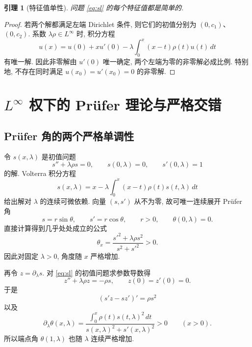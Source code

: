 \documentclass[UTF8]{ctexart}
\newtheorem{lemma}[theorem]{引理}
\begin{document}
\begin{lemma}[特征值单性]\label{lem:simple}
问题 \eqref{eq:sl} 的每个特征值都是简单的.
\end{lemma}

\begin{proof}
若两个解都满足左端 Dirichlet 条件, 则它们的初值分别为 $(0,c_1)$、$(0,c_2)$. 系数
$\lambda\rho\in L^\infty$ 时, 积分方程
\begin{equation*}
	u(x)=u(0)+xu'(0)-\lambda\int_0^x(x-t)\rho(t)u(t)\,dt
\end{equation*}
有唯一解. 因此非零解由 $u'(0)$ 唯一确定, 两个左端为零的非零解必成比例. 特别地,
不存在同时满足 $u(x_0)=u'(x_0)=0$ 的非零解.
\end{proof}

\section{\texorpdfstring{$L^\infty$}{L-infinity} 权下的 Pr\"ufer 理论与严格交错}
\subsection{Pr\"ufer 角的两个严格单调性}

令 $s(x,\lambda)$ 是初值问题
\begin{equation}
	s''+\lambda\rho s=0,\qquad s(0,\lambda)=0,\qquad s'(0,\lambda)=1
\end{equation}
的解. Volterra 积分方程
\begin{equation*}
	s(x,\lambda)=x-\lambda\int_0^x(x-t)\rho(t)s(t,\lambda)\,dt
\end{equation*}
给出解对 $\lambda$ 的连续可微依赖. 向量 $(s,s')$ 从不为零, 故可唯一连续展开 Pr\"ufer 角
\begin{equation*}
	s=r\sin\theta,\qquad s'=r\cos\theta,\qquad r>0,\qquad \theta(0,\lambda)=0.
\end{equation*}
直接计算得到几乎处处成立的公式
\begin{equation}
	\theta_x=\frac{s'^2+\lambda\rho s^2}{s^2+s'^2}>0.
	\label{eq:theta_x}
\end{equation}
因此对固定 $\lambda>0$, 角度随 $x$ 严格增加.

再令 $z=\partial_\lambda s$. 对 \eqref{eq:sl} 的初值问题求参数导数得
\begin{equation*}
	z''+\lambda\rho z=-\rho s,\qquad z(0)=z'(0)=0.
\end{equation*}
于是
\begin{equation*}
	(s'z-sz')'=\rho s^2
\end{equation*}
以及
\begin{equation}
	\partial_\lambda\theta(x,\lambda)=\frac{\int_0^x\rho(t)s(t,\lambda)^2\,dt}
		{s(x,\lambda)^2+s'(x,\lambda)^2}>0\qquad(x>0).
	\label{eq:theta_lambda}
\end{equation}
所以端点角 $\theta(1,\lambda)$ 也随 $\lambda$ 连续严格增加.
\end{document}
